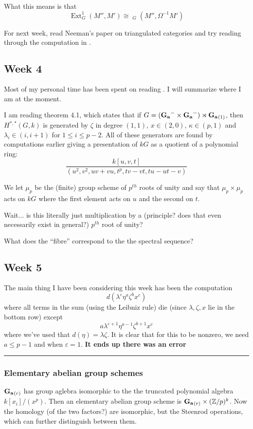 \documentclass[12pt]{article}
\theoremstyle{nonumberbreak}
\theoremstyle{changebreak}
\theoremstyle{nonumberplain}
\theoremstyle{change}
\newcommand*{\bbZ}{\mathbb{Z}}
\DeclareMathOperator{\Hom}{Hom}
\DeclareMathOperator{\Ext}{Ext}
\newcommand*{\Ga}{\ensuremath\mathbf{G_a}}
\DeclareMathOperator{\stHom}{\underline{\Hom}}
\newcommand*{\brk}{
\rule{2in}{.1pt}
}
\begin{document}
What this means is that 
\[\Ext_G^1(M'',M')\cong \stHom_G(M'',\Omega^{-1}M')\]


For next week, read Neeman's paper on triangulated categories and try reading through the computation
in \cite{julia-dave}.

\subsection{Week 4}
Most of my personal time has been spent on reading \cite{julia-dave}. I will summarize where I am at the moment.

I am reading theorem 4.1, which states that if $G=(\Ga^-\times \Ga^-)\rtimes \Ga_{(1)}$, then $H^{\ast,\ast}(G,k)$
is generated by $\zeta$ in degree $(1,1)$, $x\in(2,0)$, $\kappa\in(p,1)$ and $\lambda_i\in (i,i+1)$ for $1\le i\le p-2$.
All of these generators are found by computations earlier giving a presentation of $kG$ as a quotient of a polynomial ring:
\[\frac{k[u,v,t]}{(u^2,v^2,uv+vu,t^p, tv-vt, tu-ut-v)}\]

\begin{qst}
	We let $\mu_p$ be the (finite) group scheme of $p^{th}$ roots of unity and say that $\mu_p\times\mu_p$
	acts on $kG$ where the first element acts on $u$ and the second on $t$.
\end{qst}
Wait... is this literally just multiplication by a (principle? does that even necessarily exist in general?) $p^{th}$ root of unity?

\begin{qst}
	What does the ``fibre'' correspond to the the spectral sequence?
\end{qst}

\subsection{Week 5}
The main thing I have been considering this week has been the computation
\[d(\lambda^\varepsilon\eta^a\zeta^bx^c)\]
where all terms in the sum (using the Leibniz rule) die (since $\lambda,\zeta,x$ lie in the bottom row) except 
\[a\lambda^{\varepsilon+1}\eta^{a-1}\zeta^{b+1}x^c\]
where we've used that $d(\eta)=\lambda\zeta$. It is clear that for this to be nonzero, we need $a\le p-1$
and when $\varepsilon=1$. \textbf{It ends up there was an error}

\brk

\subsubsection{Elementary abelian group schemes}
$\Ga_{(r)}$ has group aglebra isomorphic to the the truncated polynomial algebra $k[x_i]/(x^p)$. Then an elementary abelian
group scheme is $\Ga_{(r)}\times(\bbZ/p)^k$. Now the homology (of the two factors?) are isomorphic, but
the Steenrod operations, which can further distinguish between them.
\end{document}

